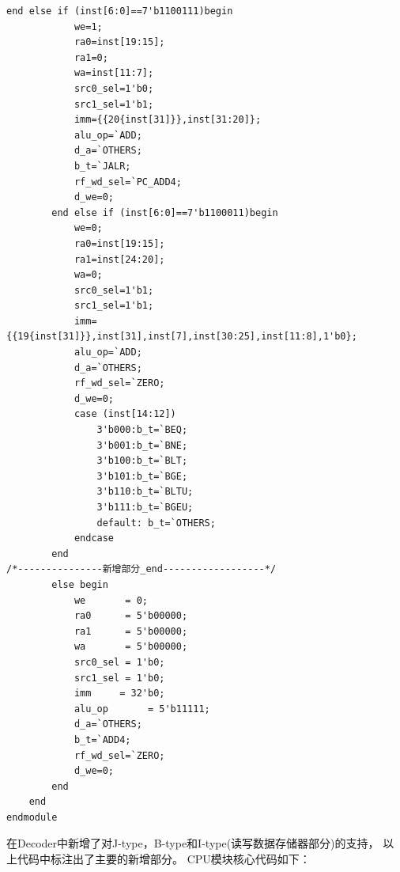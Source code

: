 \documentclass[12pt,a4paper]{ctexart}
\begin{document}
\begin{lstlisting}[style=verilog]
        end else if (inst[6:0]==7'b1100111)begin
            we=1;
            ra0=inst[19:15];
            ra1=0;
            wa=inst[11:7];
            src0_sel=1'b0;
            src1_sel=1'b1;
            imm={{20{inst[31]}},inst[31:20]};
            alu_op=`ADD;
            d_a=`OTHERS;
            b_t=`JALR;
            rf_wd_sel=`PC_ADD4;
            d_we=0;
        end else if (inst[6:0]==7'b1100011)begin
            we=0;
            ra0=inst[19:15];
            ra1=inst[24:20];
            wa=0;
            src0_sel=1'b1;
            src1_sel=1'b1;
            imm={{19{inst[31]}},inst[31],inst[7],inst[30:25],inst[11:8],1'b0};
            alu_op=`ADD;
            d_a=`OTHERS;
            rf_wd_sel=`ZERO;
            d_we=0;
            case (inst[14:12])
                3'b000:b_t=`BEQ;
                3'b001:b_t=`BNE;
                3'b100:b_t=`BLT;
                3'b101:b_t=`BGE;
                3'b110:b_t=`BLTU;
                3'b111:b_t=`BGEU; 
                default: b_t=`OTHERS;
            endcase
        end
/*---------------新增部分_end------------------*/
        else begin
            we       = 0;
            ra0      = 5'b00000;
            ra1      = 5'b00000;
            wa       = 5'b00000;
            src0_sel = 1'b0;
            src1_sel = 1'b0;
            imm     = 32'b0;
            alu_op       = 5'b11111;
            d_a=`OTHERS;
            b_t=`ADD4;
            rf_wd_sel=`ZERO;
            d_we=0;
        end
    end
endmodule
\end{lstlisting}\par
在Decoder中新增了对J-type，B-type和I-type(读写数据存储器部分)的支持，
以上代码中标注出了主要的新增部分。
CPU模块核心代码如下：
\end{document}
